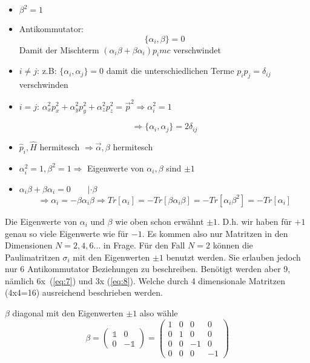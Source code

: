 \begin{itemize}
\item  \(\boxed{\beta^2=1}\)
\item Antikommutator: 
  \begin{equation}
    \label{eq:8}
    \boxed{\{\alpha_i,\beta\}=0}
  \end{equation}
Damit der Mischterm \((\alpha_i\beta+\beta\alpha_i)p_i mc\)  verschwindet 

\item \(i\neq j\): z.B:  \(\{\alpha_i,\alpha_j\}=0\) damit die unterschiedlichen Terme \(p_ip_j = \delta_{ij}\) verschwinden
\item \(i=j\): \(\alpha_x^2p_x^2+\alpha_y^2p_y^2+\alpha_z^2p_z^2=\vec p^2 \Rightarrow \alpha_i^2 = 1\)

\begin{equation}
  \label{eq:7}
  \Rightarrow \boxed{\{\alpha_i,\alpha_j\}=2\delta_{ij}}
\end{equation}

\item \(\hat p_i,\hat H\) hermitesch \(\Rightarrow \vec\alpha,\beta\) hermitesch
\item \(\alpha_i^2=1,\beta^2=1 \Rightarrow \) Eigenwerte von \(\alpha_i,\beta\) sind \(\pm 1\)
\item \(\alpha_i\beta + \beta\alpha_i=0\qquad |\cdot \beta\)
\[\Rightarrow \alpha_i=-\beta\alpha_i\beta \Rightarrow Tr[\alpha_i] = -Tr[\beta\alpha_i\beta]=-Tr[\alpha_i\beta^2]=-Tr[\alpha_i]\]
\end{itemize}


Die Eigenwerte von \(\alpha_i\) und \(\beta\) wie oben schon erwähnt \(\pm 1\). D.h. wir haben für \(+1\) genau so viele Eigenwerte wie für \(-1\). Es kommen also nur Matritzen in den Dimensionen \(N=2,4,6...\) in Frage. Für den Fall \(N=2\) können die Paulimatritzen \(\sigma_i\) mit den Eigenwerten \(\pm 1\) benutzt werden. Sie erlauben jedoch nur 6 Antikommutator Beziehungen zu beschreiben. Benötigt werden aber 9, nämlich 6x~(\ref{eq:7}) und 3x (\ref{eq:8}). Welche durch 4 dimensionale Matritzen (4x4=16) ausreichend beschrieben werden.


\(\beta\) diagonal mit den Eigenwerten \(\pm 1\) also wähle 
\begin{equation}
  \label{eq:9}
  \beta= \begin{pmatrix}\mathbb 1&0\\ 0&-\mathbb 1\end{pmatrix} = \begin{pmatrix}1&0&0&0\\ 0&1&0&0\\ 0&0&-1&0\\0&0&0&-1\end{pmatrix}
\end{equation}

